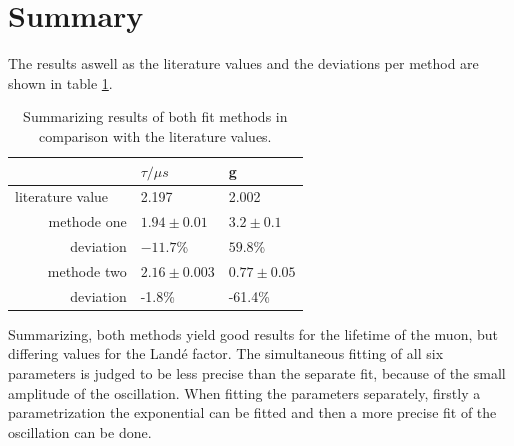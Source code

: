 \documentclass{include/thesisclass3}
\begin{document}
\section{Summary}
The results aswell as the literature values and the deviations per method are shown in table \ref{tablö}.\\

\begin{table}[H]
\caption{\label{tablö}Summarizing results of both fit methods in comparison with the literature values.}
\begin{center}
\begin{tabular}{r|ll}
 & $\tau /\mu s$ & g \\ 
\toprule
literature value $\quad$& 2.197 & 2.002 \\ 
\midrule
methode one & $1.94 \pm 0.01$ & $3.2\pm 0.1$ \\ 
deviation & $-11.7$\% & $59.8$\% \\ 
\midrule 
methode two & $2.16 \pm 0.003$ & $ 0.77 \pm 0.05$ \\  
deviation & -1.8\% & -61.4\%  
\label{tablö}
\end{tabular} 
\end{center}
\end{table}

Summarizing, both methods yield good results for the lifetime of the muon, but differing values for the Landé factor. 
The simultaneous fitting of all six parameters is judged to be less precise than the separate fit, because of the small amplitude of the oscillation.
When fitting the parameters separately, firstly a parametrization the exponential can be fitted and then a more precise fit of the oscillation can be done.  
\end{document}
